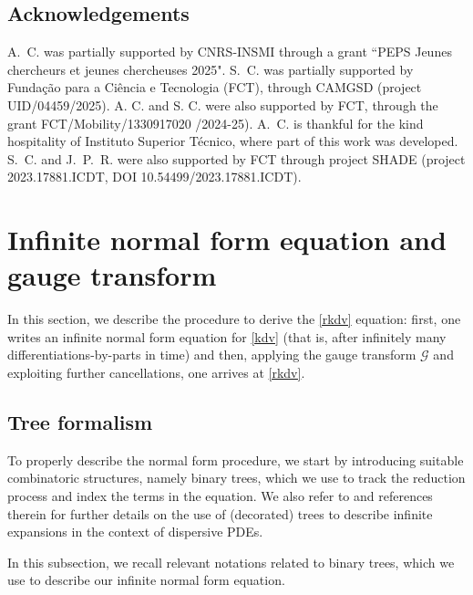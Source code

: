 \documentclass[a4paper,
11pt,  reqno]{amsart}
\newcommand{\5}{\textup{V}}
\theoremstyle{remark}
\newcommand{\Gc}{\mathcal{G}}
\numberwithin{equation}{section}
\numberwithin{theorem}{section}
\begin{document}
\subsection{Acknowledgements} A.~C. was partially supported by  CNRS-INSMI through a grant ``PEPS Jeunes chercheurs et jeunes chercheuses 2025". S.~C. was partially supported by Funda\c{c}\~ao para a Ci\^encia e Tecnologia (FCT), through CAMGSD (project UID/04459/2025). A. C. and S. C. were also supported by FCT, through the grant FCT/Mobility/1330917020 /2024-25). A.~C. is thankful for the kind hospitality of Instituto Superior Técnico, where part of this work was developed. S.~C. and J.~P.~R. were also supported by FCT through project SHADE (project 2023.17881.ICDT, DOI  10.54499/2023.17881.ICDT).



\section{Infinite normal form equation and gauge transform}\label{sec:infr}


In this section, we describe the procedure to derive the \eqref{rkdv} equation:
first, one writes an infinite normal form equation for \eqref{kdv} (that is, after infinitely
many differentiations-by-parts in time) and then, applying the gauge transform $\Gc$ and exploiting further cancellations, one arrives at \eqref{rkdv}. 
 



\subsection{Tree formalism}	
\label{SUB:tree}


To properly describe the normal form procedure, we start by introducing suitable combinatoric structures, namely  binary trees, which we use to track the reduction process and index the terms in the equation. 
We also refer to \cite{Bruned, Christ_power, GuoKwonOh_nls,kishimoto, KOY20} and references therein for further details on the use of (decorated) trees to describe infinite expansions in the context of dispersive PDEs. 

In this subsection, we recall relevant notations related to binary trees, which we use to describe our infinite normal form equation.
\end{document}

